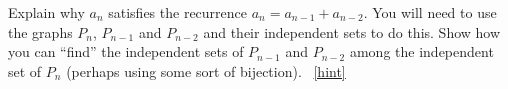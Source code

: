 \documentclass{book}
\begin{document}
\setcounter{project}{133}
\addtocounter{project}{-1}
\begin{activity}[]\label{activity-126}
\hypertarget{p-940}{}%
Explain why \(a_n\) satisfies the recurrence \(a_n = a_{n-1} + a_{n-2}\).  You will need to use the graphs \(P_n\), \(P_{n-1}\) and \(P_{n-2}\) and their independent sets to do this.  Show how you can ``find'' the independent sets of \(P_{n-1}\) and \(P_{n-2}\) among the independent set of \(P_{n}\) (perhaps using some sort of bijection).%
~\hfill{\tiny\hyperlink{a-133}{[hint]}\hypertarget{q-133}{}}\end{activity}
\end{document}
